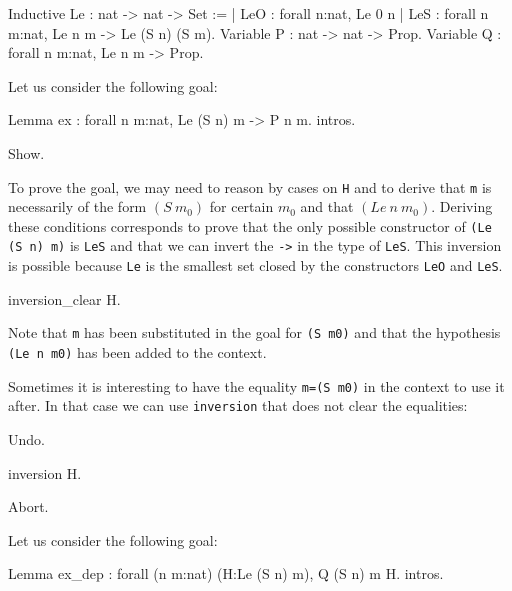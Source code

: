 \begin{coq_example*}
Inductive Le : nat -> nat -> Set :=
  | LeO : forall n:nat, Le 0 n
  | LeS : forall n m:nat, Le n m -> Le (S n) (S m).
Variable P : nat -> nat -> Prop.
Variable Q : forall n m:nat, Le n m -> Prop.
\end{coq_example*}

Let us consider the following goal:

\begin{coq_eval}
Lemma ex : forall n m:nat, Le (S n) m -> P n m.
intros.
\end{coq_eval}

\begin{coq_example}
Show.
\end{coq_example}

To prove the goal, we may need to reason by cases on \texttt{H} and to
derive that \texttt{m} is necessarily of
the form $(S~m_0)$ for certain $m_0$ and that $(Le~n~m_0)$.
Deriving these conditions corresponds to prove that the
only possible constructor of \texttt{(Le (S n) m)} is
\texttt{LeS} and that we can invert the
\texttt{->} in the type  of \texttt{LeS}.
This inversion is possible because \texttt{Le} is the smallest set closed by
the constructors \texttt{LeO} and \texttt{LeS}.

\begin{coq_example}
inversion_clear H.
\end{coq_example}

Note that \texttt{m} has been substituted in the goal for \texttt{(S m0)}
and that the hypothesis \texttt{(Le n m0)} has been added to the
context.

Sometimes it is
interesting to have the equality \texttt{m=(S m0)} in the
context to use it after. In that case we can use \texttt{inversion} that
does not clear the equalities:

\begin{coq_eval}
Undo.
\end{coq_eval}

\begin{coq_example}
inversion H.
\end{coq_example}

\begin{coq_eval}
Abort.
\end{coq_eval}


Let us consider the following goal:

\begin{coq_eval}
Lemma ex_dep : forall (n m:nat) (H:Le (S n) m), Q (S n) m H.
intros.
\end{coq_eval}

